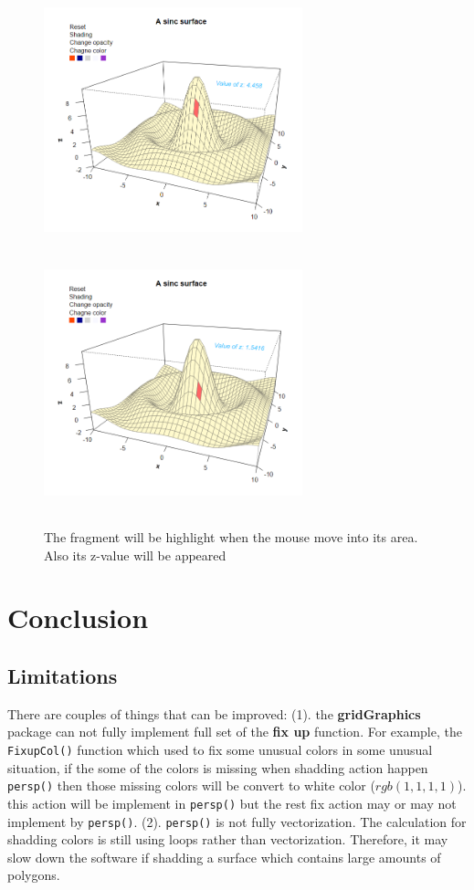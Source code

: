 \documentclass[paper=a4, fontsize=11pt]{report}
\begin{document}
\begin{figure}[h]
	\begin{center}
		\includegraphics[height = 7.5cm, width = 7.5cm]{figure/svg/hlight_1.PNG}
		\includegraphics[height = 7.5cm, width = 7.5cm]{figure/svg/hlight_2.PNG}
		\caption{The fragment will be highlight when the mouse move into its area. Also its z-value will be appeared}
		\label{Example_6.3.4}
	\end{center}
\end{figure}

\chapter{Conclusion}

\section{Limitations}
There are couples of things that can be improved: (1). the \textbf{gridGraphics} package can not fully implement full set of the \textbf{fix up} function. For example, the \texttt{FixupCol()} function which used to fix some unusual colors in some unusual situation, if the some of the colors is missing when shadding action happen \texttt{persp()} then those missing colors will be convert to white color ($rgb(1, 1, 1, 1)$). this action will be implement in \texttt{persp()} but the rest fix action may or may not implement by \texttt{persp()}. (2). \texttt{persp()} is not fully vectorization. The calculation for shadding colors is still using loops rather than vectorization. Therefore, it may slow down the software if shadding a surface which contains large amounts of polygons. \\
\end{document}
